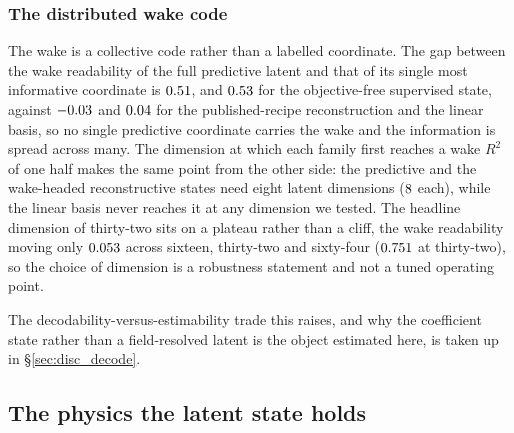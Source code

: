 

\subsubsection{The distributed wake code}
\label{sec:res_code} %

The wake is a collective code rather than a labelled coordinate. The gap between the wake readability of the full predictive latent and that of its single most informative coordinate is $0.51$, and $0.53$ for the objective-free supervised state, against $-0.03$ and $0.04$ for the published-recipe reconstruction and the linear basis, so no single predictive coordinate carries the wake and the information is spread across many. The dimension at which each family first reaches a wake $R^2$ of one half makes the same point from the other side: the predictive and the wake-headed reconstructive states need eight latent dimensions ($8$ each), while the linear basis never reaches it at any dimension we tested. The headline dimension of thirty-two sits on a plateau rather than a cliff, the wake readability moving only $0.053$ across sixteen, thirty-two and sixty-four ($0.751$ at thirty-two), so the choice of dimension is a robustness statement and not a tuned operating point.\re

The decodability-versus-estimability trade this raises, and why the coefficient state rather than a field-resolved latent is the object estimated here, is taken up in \S\ref{sec:disc_decode}.\re

\subsection{The physics the latent state holds}
\label{sec:res_latent_physics}
\label{sec:res_flow_physics} %
\label{sec:res_param_phase} %
\label{sec:res_physical} %

